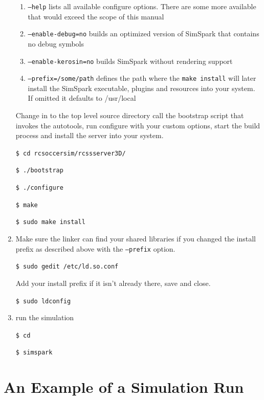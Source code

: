 \begin{enumerate}
\begin{enumerate}
\item \texttt{--help} lists all available configure options. There are some more available 
that would exceed the scope of this manual

\item \texttt{--enable-debug=no} builds an optimized version of SimSpark 
that contains no debug symbols

\item \texttt{--enable-kerosin=no} builds SimSpark without rendering support

\item \texttt{--prefix=/some/path} defines the path where the \texttt{make install} will later 
install the SimSpark executable, plugins and resources into your
system. If omitted it defaults to /usr/local

\end{enumerate}

Change in to the top level source directory call the bootstrap script
that invokes the autotools, run configure with your custom options,
start the build process and install the server into your system.

\texttt{\$ cd rcsoccersim/rcssserver3D/}

\texttt{\$ ./bootstrap}

\texttt{\$ ./configure}

\texttt{\$ make}

\texttt{\$ sudo make install}

\item Make sure the linker can find your shared libraries if you changed
the install prefix as described above with the \texttt{--prefix}
option.

\texttt{\$ sudo gedit /etc/ld.so.conf}

Add your install prefix if it isn't already there, save and close.

\texttt{\$ sudo ldconfig}

\item run the simulation

{\texttt{\$ cd}}

{\texttt{\$ simspark}}

\end{enumerate}

\section{An Example of a Simulation Run}

